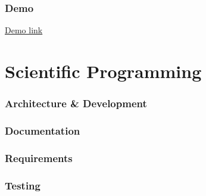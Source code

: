 \documentclass[12pt]{beamer}
\begin{document}
    \begin{frame}
        \frametitle{Demo}
        \href{http://dev-jiskefet.westeurope.cloudapp.azure.com/}{Demo link}
    \end{frame}

    \section{Scientific Programming}
    \begin{frame}
        \frametitle{Architecture \& Development}
    \end{frame}

    \begin{frame}
        \frametitle{Documentation}
    \end{frame}

    \begin{frame}
        \frametitle{Requirements}
    \end{frame}

    \begin{frame}
        \frametitle{Testing}
    \end{frame}
\end{document}
